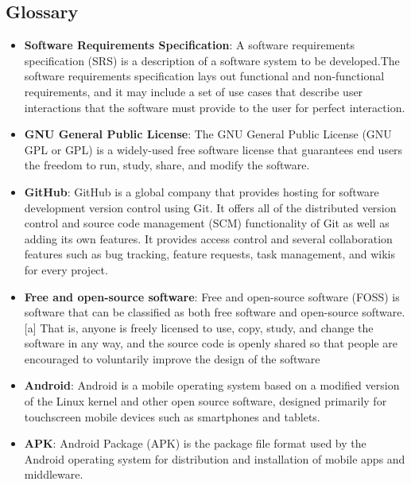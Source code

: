 \begin{appendices}
\chapter{Glossary}
\begin{itemize}
    \item \textbf{Software Requirements Specification}: A software requirements specification (SRS) is a description of a software system to be developed.The software requirements specification lays out functional and non-functional requirements, and it may include a set of use cases that describe user interactions that the software must provide to the user for perfect interaction.
    
    \item \textbf{GNU General Public License}: The GNU General Public License (GNU GPL or GPL) is a widely-used free software license that guarantees end users the freedom to run, study, share, and modify the software.
    
    \item \textbf{GitHub}: GitHub is a global company that provides hosting for software development version control using Git. It offers all of the distributed version control and source code management (SCM) functionality of Git as well as adding its own features. It provides access control and several collaboration features such as bug tracking, feature requests, task management, and wikis for every project.
    
    \item \textbf{Free and open-source software}: Free and open-source software (FOSS) is software that can be classified as both free software and open-source software.[a] That is, anyone is freely licensed to use, copy, study, and change the software in any way, and the source code is openly shared so that people are encouraged to voluntarily improve the design of the software
    
    \item \textbf{Android}: Android is a mobile operating system based on a modified version of the Linux kernel and other open source software, designed primarily for touchscreen mobile devices such as smartphones and tablets.
    
    \item \textbf{APK}: Android Package (APK) is the package file format used by the Android operating system for distribution and installation of mobile apps and middleware.
    

\end{itemize}
\end{appendices}
